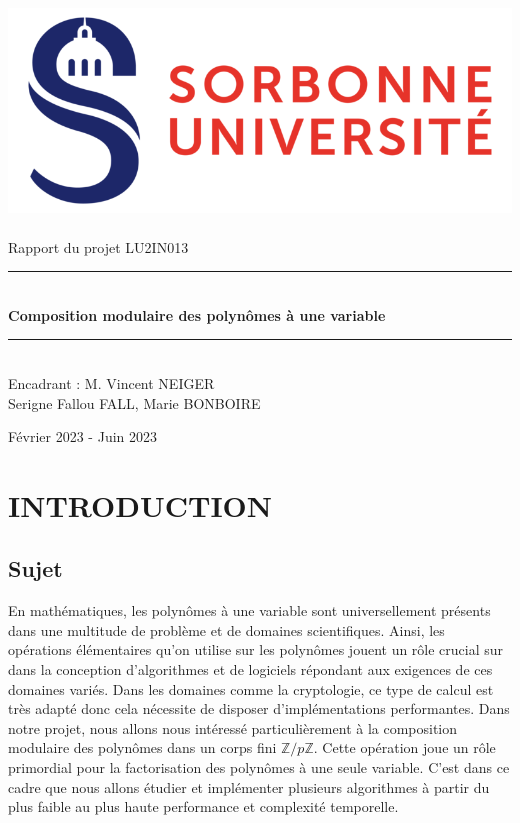 \documentclass[a4paper]{article}
\begin{document}
\thispagestyle{plain}

\begin{titlepage}
    \begin{center}

        \bigskip
        \includegraphics[scale=0.5]{logo_su.jpg}~\\[4cm]

        {\LARGE Rapport du projet LU2IN013}\\[0.3cm]
        \rule{\linewidth}{0.5mm} \\[0.6cm]
        {\huge \textbf{Composition modulaire des polynômes à une variable}}\\[0.4cm]
        \rule{\linewidth}{0.5mm} \\[1cm]
        {\large Encadrant : M. Vincent NEIGER}\\[5cm]

        {\Large Serigne Fallou FALL, Marie BONBOIRE}
        
        \vfill
        Février 2023 - Juin 2023


    \end{center}
\end{titlepage}

\newpage

\tableofcontents

\newpage


\section{INTRODUCTION}

\subsection{Sujet}

En mathématiques, les polynômes à une variable sont universellement présents dans une multitude de problème et de domaines scientifiques. Ainsi, les opérations élémentaires qu'on utilise sur les polynômes jouent un rôle crucial sur dans la conception d'algorithmes et de logiciels répondant aux exigences de ces domaines variés. Dans les domaines comme la cryptologie, ce type de calcul est très adapté donc cela nécessite de disposer d'implémentations performantes. Dans notre projet, nous allons nous intéressé particulièrement à la composition modulaire des polynômes dans un corps fini \textbf{${\mathbb{Z}/p \mathbb{Z}}$}. Cette opération joue un rôle primordial pour la factorisation des polynômes à une seule variable. C'est dans ce cadre que nous allons étudier et implémenter plusieurs algorithmes à partir du plus faible au plus haute performance et complexité temporelle.
\end{document}
